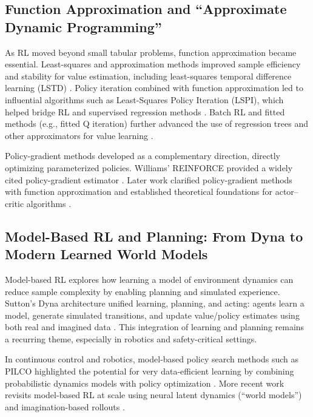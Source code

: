 \documentclass[unnumsec,webpdf,contemporary,large]{oup-authoring-template}
\theoremstyle{thmstyleone}
\theoremstyle{thmstyletwo}
\theoremstyle{thmstylethree}
\begin{document}
\subsection{Function Approximation and ``Approximate Dynamic Programming''}

As RL moved beyond small tabular problems, function approximation became essential.
Least-squares and approximation methods improved sample efficiency and stability for value estimation, including least-squares temporal difference learning (LSTD) \cite{bradtke1996lstd}.
Policy iteration combined with function approximation led to influential algorithms such as Least-Squares Policy Iteration (LSPI), which helped bridge RL and supervised regression methods \cite{lagoudakis2003lspi}.
Batch RL and fitted methods (e.g., fitted Q iteration) further advanced the use of regression trees and other approximators for value learning \cite{ernst2005tree}.

Policy-gradient methods developed as a complementary direction, directly optimizing parameterized policies.
Williams' REINFORCE provided a widely cited policy-gradient estimator \cite{williams1992reinforce}.
Later work clarified policy-gradient methods with function approximation and established theoretical foundations for actor--critic algorithms \cite{sutton2000policygradient,konda2000actorcritic}.

\subsection{Model-Based RL and Planning: From Dyna to Modern Learned World Models}

Model-based RL explores how learning a model of environment dynamics can reduce sample complexity by enabling planning and simulated experience.
Sutton's Dyna architecture unified learning, planning, and acting: agents learn a model, generate simulated transitions, and update value/policy estimates using both real and imagined data \cite{sutton1990dyna}.
This integration of learning and planning remains a recurring theme, especially in robotics and safety-critical settings.

In continuous control and robotics, model-based policy search methods such as PILCO highlighted the potential for very data-efficient learning by combining probabilistic dynamics models with policy optimization \cite{deisenroth2011pilco}.
More recent work revisits model-based RL at scale using neural latent dynamics (``world models'') and imagination-based rollouts \cite{hafner2020dreamer,janner2019mbpo}.
\end{document}
